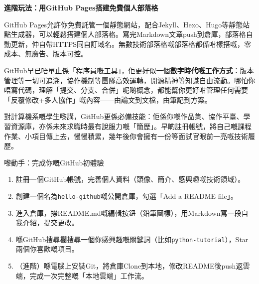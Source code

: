 \textbf{進階玩法：用GitHub Pages搭建免費個人部落格}\par

GitHub Pages允許你免費託管一個靜態網站，配合Jekyll、Hexo、Hugo等靜態站點生成器，可以輕鬆搭建個人部落格。寫完Markdown文章push到倉庫，部落格自動更新，仲自帶HTTPS同自訂域名。無數技術部落格嘅部落格都係咁樣搭嘅，零成本、無廣告、版本可控。


GitHub早已唔單止係「程序員嘅工具」，佢更好似一個\textbf{數字時代嘅工作方式}：版本管理等一切可追溯，協作機制等團隊高效運轉，開源精神等知識自由流動。哪怕你唔寫代碼，理解「提交、分支、合併」呢啲概念，都能幫你更好咁管理任何需要「反覆修改+多人協作」嘅內容——由論文到文檔，由筆記到方案。

對計算機系嘅學生嚟講，GitHub更係必備技能：佢係你嘅作品集、協作平臺、學習資源庫，亦係未來求職時最有說服力嘅「簡歷」。早啲註冊帳號，將自己嘅課程作業、小項目傳上去，慢慢積累，幾年後你會擁有一份等面試官眼前一亮嘅技術履歷。

\begin{tcbpractice}{嚟動手：完成你嘅GitHub初體驗}
\begin{enumerate}
  \item 註冊一個GitHub帳號，完善個人資料（頭像、簡介、感興趣嘅技術領域）。
  \item 創建一個名為\texttt{hello-\allowbreak github}嘅公開倉庫，勾選「Add a README file」。
  \item 進入倉庫，㩒README.md嘅編輯按鈕（鉛筆圖標），用Markdown寫一段自我介紹，提交更改。
  \item 喺GitHub搜尋欄搜尋一個你感興趣嘅關鍵詞（比如\texttt{python-\allowbreak tutorial}），Star兩個你喜歡嘅項目。
  \item （進階）喺電腦上安裝Git，將倉庫Clone到本地，修改README後push返雲端，完成一次完整嘅「本地雲端」工作流。
\end{enumerate}

\end{tcbpractice}
